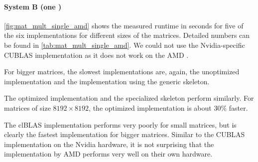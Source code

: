 \paragraph{System B (one \GPU)}
\autoref{fig:mat_mult_single_amd} shows the measured runtime in seconds for five of the six implementations for different sizes of the matrices.
Detailed numbers can be found in \autoref{tab:mat_mult_single_amd}.
We could not use the Nvidia-specific CUBLAS implementation as it does not work on the AMD \GPU.

For bigger matrices, the slowest implementations are, again, the unoptimized \OpenCL implementation and the implementation using the generic \allpairs skeleton.

The optimized \OpenCL implementation and the specialized \allpairs skeleton perform similarly.
For matrices of size $8192\times 8192$, the optimized \OpenCL implementation is about 30\% faster.

The clBLAS implementation performs very poorly for small matrices, but is clearly the fastest implementation for bigger matrices.
Similar to the CUBLAS implementation on the Nvidia hardware, it is not surprising that the implementation by AMD performs very well on their own hardware.


